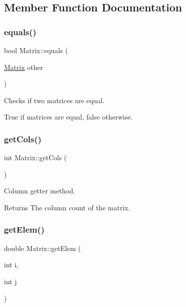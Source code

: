 \subsection{Member Function Documentation}
\mbox{\label{classMatrix_a788b59f09c9ff8a0c9d1c4377a4d8409}} 
\subsubsection{\texorpdfstring{equals()}{equals()}}
{\footnotesize\ttfamily bool Matrix\+::equals (\begin{DoxyParamCaption}\item[{\hyperlink{classMatrix}{Matrix}}]{other }\end{DoxyParamCaption})}



Checks if two matrices are equal. 

True if matrices are equal, false otherwise. \mbox{\label{classMatrix_a718a524577eb195b94e8abb7c87109a5}} 
\subsubsection{\texorpdfstring{get\+Cols()}{getCols()}}
{\footnotesize\ttfamily int Matrix\+::get\+Cols (\begin{DoxyParamCaption}{ }\end{DoxyParamCaption})}



Column getter method. 

\begin{DoxyReturn}{Returns}
The column count of the matrix. 
\end{DoxyReturn}
\mbox{\label{classMatrix_aaaf559a0afb0412c23d6f9485bbf94a8}} 
\subsubsection{\texorpdfstring{get\+Elem()}{getElem()}}
{\footnotesize\ttfamily double Matrix\+::get\+Elem (\begin{DoxyParamCaption}\item[{int}]{i,  }\item[{int}]{j }\end{DoxyParamCaption})}



